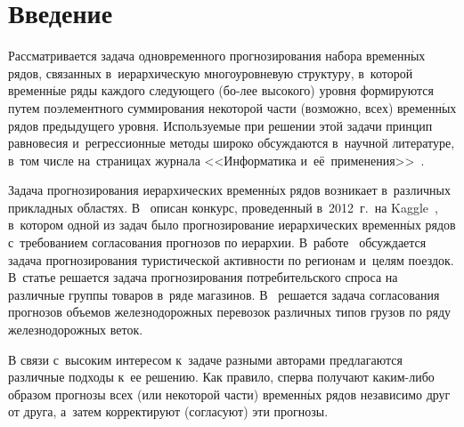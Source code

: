 

\vspace*{6pt}



\thispagestyle{headings}

\begin{multicols}{2}

\label{st\stat}



\section{Введение}

Рассматривается задача одновременного прогнозирования набора
временн$\acute{\mbox{ы}}$х рядов, связанных в~иерархическую многоуровневую
структуру, в~которой временн$\acute{\mbox{ы}}$е ряды каждого следующего (бо-\linebreak лее
высокого) уровня формируются путем поэлементного суммирования
некоторой части (возможно, всех) временн$\acute{\mbox{ы}}$х рядов предыдущего
уровня.
%
Используемые при решении этой задачи принцип равновесия
и~регрессионные методы широко обсуждаются в~научной литературе,
в~том числе на~страницах журнала
<<Информатика и~её~применения>>~\cite{tokmakova2012hyper, vasilyev2014using}.

Задача прогнозирования иерархических вре\-мен\-н$\acute{\mbox{ы}}$х рядов
возникает в~различных прикладных областях. В~\cite{hong2014global}
описан конкурс, проведенный в~2012~г.\ на Kaggle~\cite{kaggle},
в~котором одной из задач было прогнозирование иерархических
временн$\acute{\mbox{ы}}$х рядов с~требованием согласования прогнозов по иерархии.
В~работе~\cite{hyndman2011optimal} обсуждается задача
прогнозирования туристической активности по регионам и~целям
поездок. В~статье \cite{kuznetsov2011smoothing} решается задача
прогнозирования потребительского спроса на различные группы
товаров в~ряде магазинов. В~\cite{stenina2014reconciliation}
решается задача согласования прогнозов объемов железнодорожных
перевозок различных типов грузов по ряду железнодорожных веток.

В связи с~высоким интересом к~задаче разными авторами предлагаются
различные подходы к~ее решению. Как правило, сперва получают
ка\-ким-ли\-бо образом прогнозы всех (или некоторой части) временн$\acute{\mbox{ы}}$х
рядов независимо друг от друга, а~затем корректируют (согласуют)
эти прогнозы.


\end{multicols}
